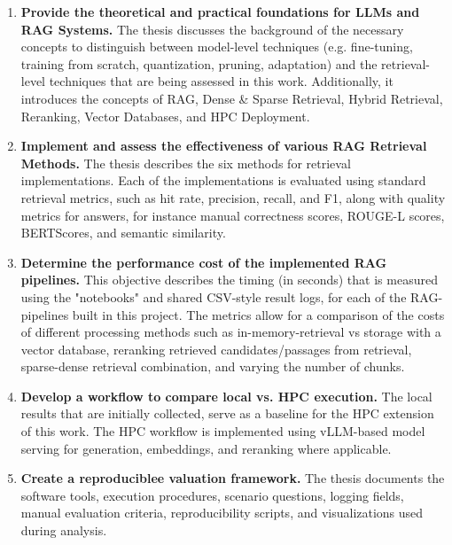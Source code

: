 \begin{enumerate}

    \item \textbf{Provide the theoretical and practical foundations for \acp{LLM} and \ac{RAG} Systems.}\newline 
    The thesis discusses the background of the necessary concepts to distinguish between model-level techniques (e.g. fine-tuning, training from scratch, quantization, pruning, adaptation) and the retrieval-level techniques that are being assessed in this work. Additionally, it introduces the concepts of RAG, Dense \& Sparse Retrieval, Hybrid Retrieval, Reranking, Vector Databases, and HPC Deployment.
    
    \item \textbf{Implement and assess the effectiveness of various \ac{RAG} Retrieval Methods.}\newline   
    The thesis describes the six methods for retrieval implementations. Each of the implementations is evaluated using standard retrieval metrics, such as hit rate, precision, recall, and F1, along with quality metrics for answers, for instance manual correctness scores, ROUGE-L scores, BERTScores, and semantic similarity.
    
    \item \textbf{Determine the performance cost of the implemented \ac{RAG} pipelines.}\newline
    This objective describes the timing (in seconds) that is measured using the "notebooks" and shared CSV-style result logs, for each of the \ac{RAG}-pipelines built in this project. The metrics allow for a comparison of the costs of different processing methods such as in-memory-retrieval vs storage with a vector database, reranking retrieved candidates/passages from retrieval, sparse-dense retrieval combination, and varying the number of chunks.
    
    \item \textbf{Develop a workflow to compare local vs. \ac{HPC} execution.}\newline
    The local results that are initially collected, serve as a baseline for the \ac{HPC} extension of this work. The \ac{HPC} workflow is implemented using \ac{vLLM}-based model serving for generation, embeddings, and reranking where applicable.
    
    \item \textbf{Create a reproduciblee valuation framework.}\newline
    The thesis documents the software tools, execution procedures, scenario questions, logging fields, manual evaluation criteria, reproducibility scripts, and visualizations used during analysis.

\end{enumerate}

